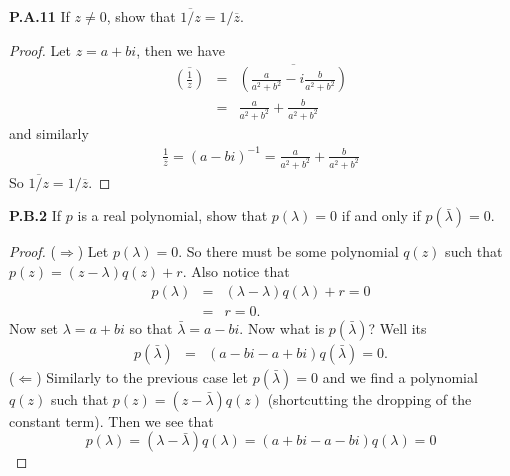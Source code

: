 \documentclass[12pt]{amsart}
\begin{document}
\begin{onehalfspace}
        \noindent\textbf{P.A.11} If $z \ne 0$, show that $\overline{1/z} = 1/\overline{z}$.
        \begin{proof}
            Let $z = a+bi$, then we have
            \begin{eqnarray*}
                \overline{\left(\frac{1}{z}\right)} & = & \overline{\left(\frac{a}{a^2 + b^2} - i\frac{b}{a^2 + b^2}\right)} \\
                                                    & = & \frac{a}{a^2+b^2} + \frac{b}{a^2+b^2}
            \end{eqnarray*}
            and similarly
            \begin{eqnarray*}
                \frac{1}{\bar{z}} = (a - bi)^{-1} = \frac{a}{a^2 + b^2} + \frac{b}{a^2+b^2}
            \end{eqnarray*}
            So $\overline{1/z} = 1/\overline{z}$.
        \end{proof}

        \noindent\textbf{P.B.2} If $p$ is a real polynomial, show that $p(\lambda) = 0$ if
        and only if $p(\bar{\lambda}) = 0$.
        \begin{proof}
            ($\Rightarrow$) Let $p(\lambda) = 0$. So there must be some polynomial $q(z)$ such that
            $p(z) = (z - \lambda)q(z) + r$. Also notice that
            \begin{eqnarray*}
                p(\lambda) & = & (\lambda - \lambda)q(\lambda) + r = 0 \\
                           & = & r = 0.
            \end{eqnarray*}
            Now set $\lambda = a+bi$ so that $\bar{\lambda} = a - bi$. Now what is $p(\bar{\lambda})$? Well its
            \begin{eqnarray*}
                p(\bar{\lambda}) & = & (a - bi - a + bi)q(\bar{\lambda}) = 0.
            \end{eqnarray*}
            ($\Leftarrow$) Similarly to the previous case let $p(\bar{\lambda}) = 0$ and we find a polynomial $q(z)$
            such that $p(z) = (z-\bar{\lambda})q(z)$ (shortcutting the dropping of the constant term). Then we see that
            \begin{displaymath}
                p(\lambda) = (\lambda - \bar{\lambda})q(\lambda) = (a + bi - a - bi)q(\lambda) = 0
            \end{displaymath}
        \end{proof}


\end{onehalfspace}
\end{document}
